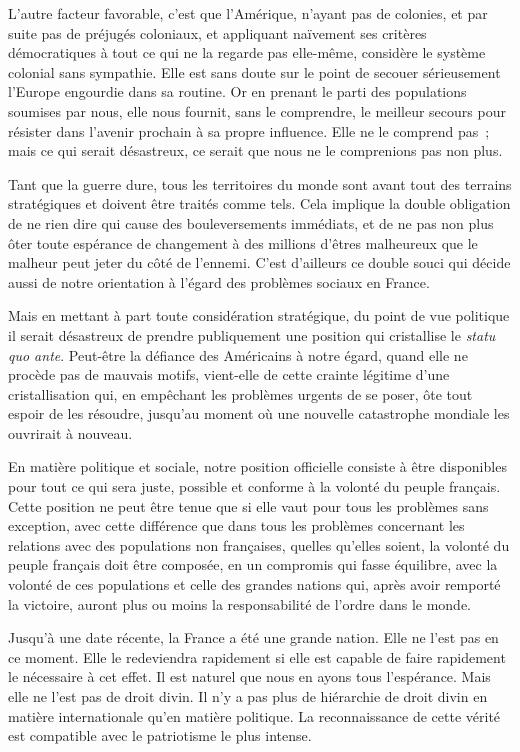 \documentclass[french,twoside]{book} %
\begin{document}
L'autre facteur favorable, c'est que l'Amérique, n'ayant pas de colonies, et par suite pas de préjugés coloniaux, et appliquant naïvement ses critères démocratiques à tout ce qui ne la regarde pas elle-même, considère le système colonial sans sympathie. Elle est sans doute sur le point de secouer sérieuse­ment l'Europe engourdie dans sa routine. Or en prenant le parti des popula­tions soumises par nous, elle nous fournit, sans le comprendre, le meilleur secours pour résister dans l'avenir prochain à sa propre influence. Elle ne le comprend pas ; mais ce qui serait désastreux, ce serait que nous ne le comprenions pas non plus.\par
Tant que la guerre dure, tous les territoires du monde sont avant tout des terrains stratégiques et doivent être traités comme tels. Cela implique la double obligation de ne rien dire qui cause des bouleversements immédiats, et de ne pas non plus ôter toute espérance de changement à des millions d'êtres malheureux que le malheur peut jeter du côté de l'ennemi. C'est d'ailleurs ce double souci qui décide aussi de notre orientation à l'égard des problèmes sociaux en France.\par
Mais en mettant à part toute considération stratégique, du point de vue politique il serait désastreux de prendre publiquement une position qui cristal­lise le {\itshape statu quo ante}. Peut-être la défiance des Américains à notre égard, quand elle ne procède pas de mauvais motifs, vient-elle de cette crainte légiti­me d'une cristallisation qui, en empêchant les problèmes urgents de se poser, ôte tout espoir de les résoudre, jusqu'au moment où une nouvelle catastrophe mondiale les ouvrirait à nouveau.\par
En matière politique et sociale, notre position officielle consiste à être disponibles pour tout ce qui sera juste, possible et conforme à la volonté du peuple français. Cette position ne peut être tenue que si elle vaut pour tous les problèmes sans exception, avec cette différence que dans tous les problèmes concernant les relations avec des populations non françaises, quelles qu'elles soient, la volonté du peuple français doit être composée, en un compromis qui fasse équilibre, avec la volonté de ces populations et celle des grandes nations qui, après avoir remporté la victoire, auront plus ou moins la responsabilité de l'ordre dans le monde.\par
Jusqu'à une date récente, la France a été une grande nation. Elle ne l'est pas en ce moment. Elle le redeviendra rapidement si elle est capable de faire rapidement le nécessaire à cet effet. Il est naturel que nous en ayons tous l'espérance. Mais elle ne l'est pas de droit divin. Il n'y a pas plus de hiérarchie de droit divin en matière internationale qu'en matière politique. La reconnais­sance de cette vérité est compatible avec le patriotisme le plus intense.\par
\end{document}
